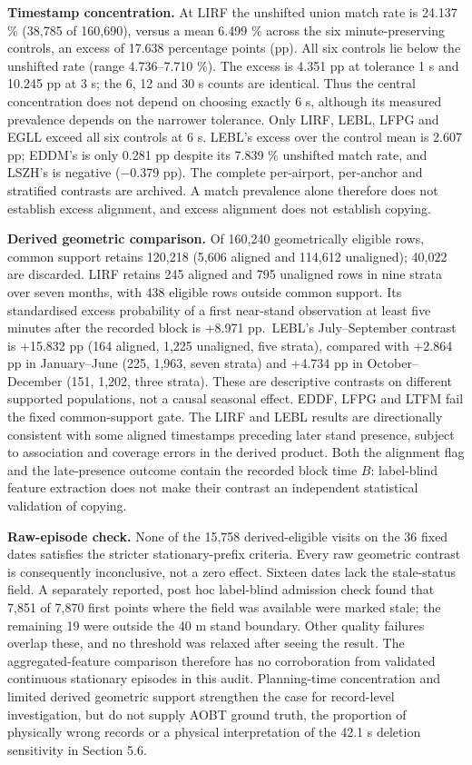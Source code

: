 \documentclass[
  manuscript=article,  %
  layout=preprint,     %
  year=2026,
  volume=4,
]{extra/joas}
\begin{document}
\textbf{Timestamp concentration.} At LIRF the unshifted union match rate is 24.137 \% (38,785 of 160,690), versus a mean 6.499 \% across the six minute-preserving controls, an excess of 17.638 percentage points (pp). All six controls lie below the unshifted rate (range 4.736--7.710 \%). The excess is 4.351 pp at tolerance 1 s and 10.245 pp at 3 s; the 6, 12 and 30 s counts are identical. Thus the central concentration does not depend on choosing exactly 6 s, although its measured prevalence depends on the narrower tolerance. Only LIRF, LEBL, LFPG and EGLL exceed all six controls at 6 s. LEBL's excess over the control mean is 2.607 pp; EDDM's is only 0.281 pp despite its 7.839 \% unshifted match rate, and LSZH's is negative ($-$0.379 pp). The complete per-airport, per-anchor and stratified contrasts are archived. A match prevalence alone therefore does not establish excess alignment, and excess alignment does not establish copying.

\textbf{Derived geometric comparison.} Of 160,240 geometrically eligible rows, common support retains 120,218 (5,606 aligned and 114,612 unaligned); 40,022 are discarded. LIRF retains 245 aligned and 795 unaligned rows in nine strata over seven months, with 438 eligible rows outside common support. Its standardised excess probability of a first near-stand observation at least five minutes after the recorded block is +8.971 pp.~LEBL's July--September contrast is +15.832 pp (164 aligned, 1,225 unaligned, five strata), compared with +2.864 pp in January--June (225, 1,963, seven strata) and +4.734 pp in October--December (151, 1,202, three strata). These are descriptive contrasts on different supported populations, not a causal seasonal effect. EDDF, LFPG and LTFM fail the fixed common-support gate. The LIRF and LEBL results are directionally consistent with some aligned timestamps preceding later stand presence, subject to association and coverage errors in the derived product. Both the alignment flag and the late-presence outcome contain the recorded block time \(B\): label-blind feature extraction does not make their contrast an independent statistical validation of copying.

\textbf{Raw-episode check.} None of the 15,758 derived-eligible visits on the 36 fixed dates satisfies the stricter stationary-prefix criteria. Every raw geometric contrast is consequently inconclusive, not a zero effect. Sixteen dates lack the stale-status field. A separately reported, post hoc label-blind admission check found that 7,851 of 7,870 first points where the field was available were marked stale; the remaining 19 were outside the 40 m stand boundary. Other quality failures overlap these, and no threshold was relaxed after seeing the result. The aggregated-feature comparison therefore has no corroboration from validated continuous stationary episodes in this audit. Planning-time concentration and limited derived geometric support strengthen the case for record-level investigation, but do not supply AOBT ground truth, the proportion of physically wrong records or a physical interpretation of the 42.1 s deletion sensitivity in Section 5.6.
\end{document}
